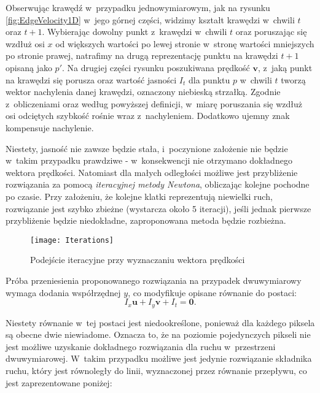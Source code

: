      Obserwując krawędź w~przypadku jednowymiarowym, jak na rysunku \ref{fig:EdgeVelocity1D} w~jego górnej części, widzimy kształt krawędzi w~chwili $t$ oraz $t+1$. Wybierając dowolny punkt z~krawędzi w~chwili $t$ oraz poruszając się wzdłuż osi $x$ od większych wartości po lewej stronie w~stronę wartości mniejszych po stronie prawej, natrafimy na drugą reprezentację punktu na krawędzi $t+1$ opisaną jako $p'$. Na drugiej części rysunku poszukiwana prędkość $\mathbf{v}$, z~jaką punkt na krawędzi się porusza oraz wartość jasności $I_{t}$ dla punktu $p$ w~chwili $t$ tworzą wektor nachylenia danej krawędzi, oznaczony niebieską strzałką. Zgodnie z~obliczeniami oraz według powyższej definicji, w~miarę poruszania się wzdłuż osi odciętych szybkość rośnie wraz z~nachyleniem. Dodatkowo ujemny znak kompensuje nachylenie.

      Niestety, jasność nie zawsze będzie stała, i~poczynione założenie nie będzie w~takim przypadku prawdziwe - w~konsekwencji nie otrzymano dokładnego wektora prędkości. Natomiast dla małych odległości możliwe jest przybliżenie rozwiązania za pomocą \textit{iteracyjnej metody Newtona}, obliczając kolejne pochodne po czasie. Przy założeniu, że kolejne klatki reprezentują niewielki ruch, rozwiązanie jest szybko zbieżne (wystarcza około 5 iteracji), jeśli jednak pierwsze przybliżenie będzie niedokładne, zaproponowana metoda będzie rozbieżna.

        \begin{figure}[!ht]
          \centering
          \texttt{[image: Iterations]}
          \caption[Podejście iteracyjne przy wyznaczaniu wektora prędkości]{Podejście iteracyjne przy wyznaczaniu wektora prędkości}
          \label{fig:Iterations}
        \end{figure}

      Próba przeniesienia proponowanego rozwiązania na przypadek dwuwymiarowy wymaga dodania współrzędnej $y$, co modyfikuje opisane równanie do postaci:
      \begin{equation}
        I_{x}\mathbf{u} + I_{y}\mathbf{v} + I_{t} = \mathbf{0}.
      \end{equation}

      Niestety równanie w~tej postaci jest niedookreślone, ponieważ dla każdego piksela są obecne dwie niewiadome. Oznacza to, że na poziomie pojedynczych pikseli nie jest możliwe uzyskanie dokładnego rozwiązania dla ruchu w~przestrzeni dwuwymiarowej. W~takim przypadku możliwe jest jedynie rozwiązanie składnika ruchu, który jest równoległy do linii, wyznaczonej przez równanie przepływu, co jest zaprezentowane poniżej:


